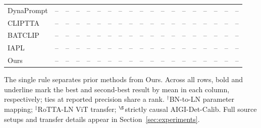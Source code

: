 \begin{table}[t]
{\begin{tabular}{lcccccccccccccccccc}
DynaPrompt & -- & -- & -- & -- & -- & -- & -- & -- & -- & -- & -- & -- & -- & -- & -- & -- & -- & -- \\
CLIPTTA & -- & -- & -- & -- & -- & -- & -- & -- & -- & -- & -- & -- & -- & -- & -- & -- & -- & -- \\
BATCLIP & -- & -- & -- & -- & -- & -- & -- & -- & -- & -- & -- & -- & -- & -- & -- & -- & -- & -- \\
IAPL & -- & -- & -- & -- & -- & -- & -- & -- & -- & -- & -- & -- & -- & -- & -- & -- & -- & -- \\
\midrule
Ours & -- & -- & -- & -- & -- & -- & -- & -- & -- & -- & -- & -- & -- & -- & -- & -- & -- & -- \\
\bottomrule
\end{tabular}%
}
\vspace{2pt}
\parbox{\textwidth}{\footnotesize The single rule separates prior methods from Ours. Across all rows, bold and underline mark the best and second-best result by mean in each column, respectively; ties at reported precision share a rank. $^{\dagger}$BN-to-LN parameter mapping; $^{\ddagger}$RoTTA-LN ViT transfer; $^{\S}$strictly causal AIGI-Det-Calib. Full source setups and transfer details appear in Section~\ref{sec:experiments}.}
\end{table}
